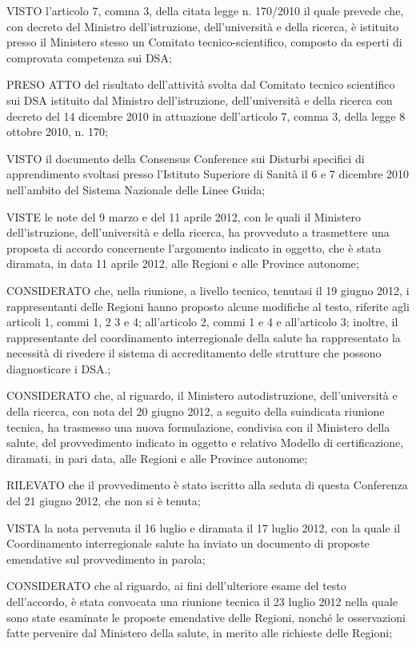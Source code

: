 VISTO l'articolo 7, comma 3, della citata legge n. 170/2010 il quale prevede che, con decreto del Ministro dell'istruzione, dell'università e della ricerca, è istituito presso il Ministero stesso un Comitato tecnico-scientifico, composto da esperti di comprovata competenza sui DSA;

PRESO ATTO del risultato dell'attività svolta dal Comitato tecnico scientifico sui DSA istituito dal Ministro dell'istruzione, dell'università e della ricerca con decreto del 14 dicembre 2010 in attuazione dell'articolo 7, comma 3, della legge 8 ottobre 2010, n. 170;

VISTO il documento della Consensus Conference sui Disturbi specifici di apprendimento svoltasi presso l’Istituto Superiore di Sanità il 6 e 7 dicembre 2010 nell'ambito del Sistema Nazionale delle Linee Guida;

VISTE le note del 9 marzo e del 11 aprile 2012, con le quali il Ministero dell'istruzione, dell'università e della ricerca, ha provveduto a trasmettere una proposta di accordo concernente l'argomento indicato in oggetto, che è stata diramata, in data 11 aprile 2012, alle Regioni e alle Province autonome;

CONSIDERATO che, nella riunione, a livello tecnico, tenutasi il 19 giugno 2012, i rappresentanti delle Regioni hanno proposto alcune modifiche al testo, riferite agli articoli 1, commi 1, 2 3 e 4; all'articolo 2, commi 1 e 4 e all'articolo 3; inoltre, il rappresentante del coordinamento interregionale della salute ha rappresentato la necessità di rivedere il sistema di accreditamento delle strutture che possono diagnosticare i DSA.;

CONSIDERATO che, al riguardo, il Ministero autodistruzione, dell'università e della ricerca, con nota del 20 giugno 2012, a seguito della suindicata riunione tecnica, ha trasmesso una nuova formulazione, condivisa con il Ministero della salute, del provvedimento indicato in oggetto e relativo Modello di certificazione, diramati, in pari data, alle Regioni e alle Province autonome;

RILEVATO che il provvedimento è stato iscritto alla seduta di questa Conferenza del 21 giugno 2012, che non si è tenuta;

VISTA la nota pervenuta il 16 luglio e diramata il 17 luglio 2012, con la quale il Coordinamento interregionale salute ha inviato un documento di proposte emendative sul provvedimento in parola;

CONSIDERATO che al riguardo, ai fini dell'ulteriore esame del testo dell'accordo, è stata convocata una riunione tecnica il 23 luglio 2012 nella quale sono state esaminate le proposte emendative delle Regioni, nonché le osservazioni fatte pervenire dal Ministero della salute, in merito alle richieste delle Regioni;

